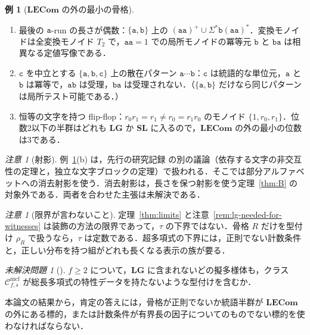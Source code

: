 \documentclass[11pt,a4paper]{ltjsarticle}
\numberwithin{equation}{section}
\theoremstyle{plain}
\theoremstyle{definition}
\newtheorem{example}[theorem]{例}
\theoremstyle{remark}
\newtheorem{remark}[theorem]{注意}
\newtheorem{openproblem}[theorem]{未解決問題}
\theoremstyle{plain}
\newcommand{\Cmcf}[2]{\mathcal{C}^{\mathrm{mcf}}_{#1,#2}}
\newcommand{\LG}{\mathbf{LG}}
\newcommand{\SL}{\mathbf{SL}}
\newcommand{\LECom}{\mathbf{L}\mathbf{ECom}}
\begin{document}
\begin{example}[$\LECom$ の外の最小の骨格]
\label{ex:minimal}
\begin{enumerate}[label=(\alph*),leftmargin=*]
\item 最後の $\mathtt a$-run の長さが偶数：$\{\mathtt a,\mathtt b\}$ 上の $(\mathtt{aa})^+\cup\Sigma^*\mathtt b(\mathtt{aa})^*$．変換モノイドは全変換モノイド $T_2$ で，$\mathtt{aa}=1$ での局所モノイドの冪等元 $\mathtt b$ と $\mathtt{ba}$ は相異なる定値写像である．
\item $\mathtt c$ を中立とする $\{\mathtt a,\mathtt b,\mathtt c\}$ 上の散在パターン $\mathtt a\cdots\mathtt b$：$\mathtt c$ は統語的な単位元，$\mathtt a$ と $\mathtt b$ は冪等で，$\mathtt{ab}$ は受理，$\mathtt{ba}$ は受理されない．（$\{\mathtt a,\mathtt b\}$ だけなら同じパターンは局所テスト可能である．）
\item 恒等の文字を持つ flip-flop：$r_0r_1=r_1\ne r_0=r_1r_0$ のモノイド $\{1,r_0,r_1\}$．位数2以下の半群はどれも $\LG$ か $\SL$ に入るので，$\LECom$ の外の最小の位数は3である．
\end{enumerate}
\end{example}

\begin{remark}[射影]
\label{rem:projections}
例~\ref{ex:minimal}(b) は，先行の研究記録 \cite{KuriyamaCompendium} の別の議論（依存する文字の非交互性の定理と，独立な文字ブロックの定理）で扱われる．そこでは部分アルファベットへの消去射影を使う．消去射影は，長さを保つ射影を使う定理~\ref{thm:B} の対象外である．両者を合わせた主張は未解決である．
\end{remark}

\begin{remark}[限界が言わないこと]
定理~\ref{thm:limits} と注意~\ref{rem:lg-needed-for-witnesses} は装飾の方法の限界であって，$\tau$ の下界ではない．骨格 $R$ だけを型付け $\rho_R$ で扱うなら，$\tau$ は定数である．超多項式の下界には，正則でない計数条件と，正しい分布を持つ組がどれも長くなる表示の族が要る．
\end{remark}

\begin{openproblem}[{\cite[未解決問題 \textit{fanout-two}]{KuriyamaCompendium}}]
\label{op:fanout-two}
$f\ge2$ について，$\LG$ に含まれないどの擬多様体も，クラス $\Cmcf{f}{s}$ が総長多項式の特性データを持たないような型付けを含むか．
\end{openproblem}

本論文の結果から，肯定の答えには，骨格が正則でないか統語半群が $\LECom$ の外にある標的，または計数条件が有界長の因子についてのものでない標的を使わなければならない．
\end{document}
